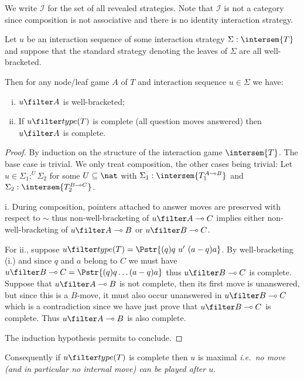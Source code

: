 We write $\mathcal{I}$ for the set of all revealed strategies. Note
that $\mathcal{I}$ is not a category since composition is not
associative and there is no identity interaction strategy.


\begin{lemma}
\label{lem:inter_complete}
Let $u$ be an interaction sequence of some interaction strategy $\Sigma : \intersem{T}$
and suppose that the standard strategy denoting the leaves of $\Sigma$ are all well-bracketed.

Then for any node/leaf game $A$ of $T$ and interaction sequence $u\in \Sigma$ we have:
\begin{enumerate}[i.]
\item $u \filter A$ is well-bracketed;

\item If $u \filter type(T)$ is complete (all question moves answered) then
    $u \filter A$ is complete.
\end{enumerate}
\end{lemma}
\begin{proof}
By induction on the structure of the interaction game $\intersem{T}$. The base case is
trivial. We only treat composition, the other cases being trivial: Let $ u \in \Sigma_1 ; ^U \Sigma_2$ for some $U \subseteq \nat$ with
$\Sigma_1 : \intersem{T_1^{A\multimap B}}$ and $\Sigma_2 : \intersem{T_2^{B\multimap C}}$.

i. During composition, pointers attached to answer moves are preserved with respect to $\sim$
thus non-well-bracketing of $u\filter A\multimap C$ implies
either non-well-bracketing of $u\filter A\multimap B$ or $u\filter B\multimap C$.

For ii., suppose $u \filter type(T) = \Pstr{(q)q\ u'\ (a-q)a }$.
By well-bracketing (i.) and since $q$ and $a$ belong to $C$ we must have
$u \filter B\multimap C = \Pstr{(q)q \ldots (a-q)a}$ thus $u \filter B\multimap C$ is complete.
Suppose that $u \filter A\multimap B$ is not complete, then its first move is unanswered,
but since this is a $B$-move, it must also occur unanswered in $u \filter B\multimap C$ which is a contradiction
since we have just prove that $u \filter B\multimap C$ is complete. Thus $u \filter A\multimap B$  is also complete.

The induction hypothesis permits to conclude.
\end{proof}
Consequently if $u\filter type(T)$ is complete then $u$ is maximal {\em i.e.~no move (and in particular no internal move) can be played after $u$}.

